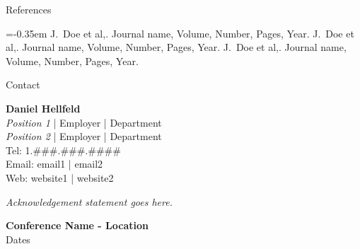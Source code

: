 \documentclass[a0paper,portrait]{baposter}
\begin{document}
\begin{poster}
\begin{posterbox}[name=refs,column=2,below=box6, height=0.158]{References}
\begin{thebibliography}{1}  %

\itemsep=-0.35em  %
\scriptsize
\bibitem{} J.~Doe et al,. Journal name, Volume, Number, Pages, Year.
\bibitem{} J.~Doe et al,. Journal name, Volume, Number, Pages, Year.
\bibitem{} J.~Doe et al,. Journal name, Volume, Number, Pages, Year.
\end{thebibliography}

\end{posterbox}





\begin{posterbox}[name=contact,column=2,below=refs, height=0.079]{Contact}

\vspace{0.1em}
\textbf{Daniel Hellfeld} \\[0.2em]
\scriptsize{
\emph{Position 1} | Employer | Department \\
\emph{Position 2} | Employer | Department \\
Tel: 1.\#\#\#.\#\#\#.\#\#\#\# \\
Email: email1 | email2\\
Web: website1 | website2
}\par
\end{posterbox}





\begin{posterbox}[name=ack,column=1,span=2,below=box5, above=bottom, headerColorOne=aaublue3, borderColor=aaublue3, boxColorOne=aaublue3, boxheaderheight=-1em]{}

\scriptsize{
\emph{Acknowledgement statement goes here.}
}\par
\end{posterbox}




\begin{posterbox}[name=titledate,column=0,span=1,below=box5, above=bottom, headerColorOne=aaublue3, borderColor=aaublue3, boxColorOne=aaublue3, boxheaderheight=-1em]{}

\begin{center}
\textbf{Conference Name - Location} \\
Dates
\end{center}

\end{posterbox}



\end{poster}
\end{document}
